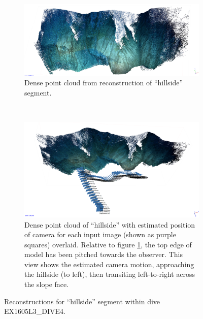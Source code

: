 \documentclass[letterpaper,12pt]{article}
\begin{document}
\begin{figure}
    \centering
    \begin{subfigure}[b]{0.95\textwidth}
        \includegraphics[width=\textwidth]{images/hillside_reconstruction.png}
        \caption{Dense point cloud from reconstruction of ``hillside'' segment.}
        \label{fig:hillside_photoscan}
    \end{subfigure}
    \\[24pt]
    \begin{subfigure}[b]{0.95\textwidth}
        \includegraphics[width=\textwidth]{images/hillside_reconstruction_trajectory.png}
        \caption{Dense point cloud of ``hillside'' with estimated position of camera for each input image (shown as purple squares) overlaid.  Relative to figure \ref{fig:hillside_photoscan}, the top edge of model has been pitched towards the observer.  This view shows the estimated camera motion, approaching the hillside (to left), then transiting left-to-right across the slope face.}
        \label{fig:hillside_photoscan_trajectory}
    \end{subfigure}
    \caption{Reconstructions for ``hillside'' segment within dive EX1605L3\_DIVE4.}
\end{figure}
\end{document}
